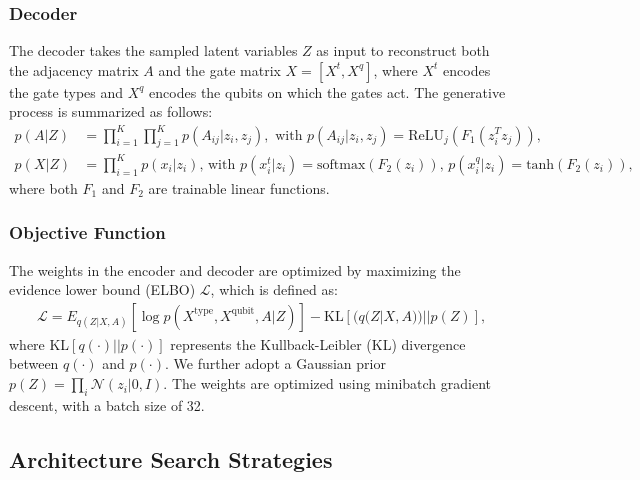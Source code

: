 \documentclass{article} %
\begin{document}
\subsubsection{Decoder}
The decoder takes the sampled latent variables $Z$ as input to reconstruct both the adjacency matrix $A$ and the gate matrix $X = [X^t, X^q]$, where $X^t$ encodes the gate types and $X^q$ encodes the qubits on which the gates act. The generative process is summarized as follows:
\begin{align}
     p(A|Z)&=\prod^{K}_{i=1}\prod^{K}_{j=1}p(A_{ij}|z_i,z_j), \text{ with } p(A_{ij}|z_i,z_j)=\text{ReLU}_j(F_{1}(z^T_iz_j))\text{,}\\
     p(X|Z)&=\prod^K_{i=1}p(x_i|z_i)\text{,}
     \text{ with } p(x^t_i|z_i)=\text{softmax}(F_{2}(z_i))\text{, } p(x^q_i|z_i)=\text{tanh}(F_{2}(z_i))\text{,}
\end{align}
where both $F_{1}$ and $F_{2}$ are trainable linear functions.


\subsubsection{Objective Function}
The weights in the encoder and decoder are optimized by maximizing the evidence lower bound (ELBO) $\mathcal{L}$, which is defined as:
\begin{align}
    \mathcal{L}=E_{q(Z|X,A)}[\log p(X^{\text{type}},X^{\text{qubit}},A|Z)]-\text{KL}[(q(Z|X,A))||p(Z)]\text{,}
\end{align}
where KL$[q(\cdot)||p(\cdot)]$ represents the Kullback-Leibler (KL) divergence between $q(\cdot)$ and $p(\cdot)$. We further adopt a Gaussian prior $p(Z)=\prod_i \mathcal{N}(z_i|0,I)$. The weights are optimized using minibatch gradient descent, with a batch size of 32.
\subsection{Architecture Search Strategies}
\end{document}
